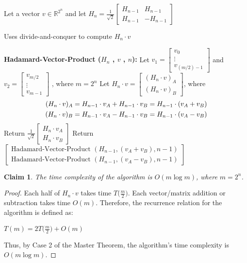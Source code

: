 \documentclass[11pt]{article}
\theoremstyle{definition}
\theoremstyle{plain}
\newtheorem{claim}{Claim}
\theoremstyle{indented-remark}
\theoremstyle{indented-proof}
\begin{document}
\noindent Let a vector $v \in \mathbb{R}^{2^{n}}$ and let 
$H_{n} = \frac{1}{\sqrt{2}}
\begin{bmatrix} 
H_{n-1} & H_{n-1} \\
H_{n-1} & -H_{n-1} 
\end{bmatrix}$
\begin{algorithm}
\caption{Uses divide-and-conquer to compute $H_{n} \cdot v$}
\begin{algorithmic}
\STATE \textbf{Hadamard-Vector-Product ($H_{n}$ , $v$ , $n$):}
\STATE Let $v_{1} = 
\begin{bmatrix} 
v_{0} \\
\vdots \\
v_{(m/2) -1} 
\end{bmatrix}$ and
$v_{2} = 
\begin{bmatrix} 
v_{m/2} \\
\vdots \\
v_{m-1} 
\end{bmatrix}$ ,
where $m = 2^{n}$
\STATE Let $H_{n} \cdot v =  
\begin{bmatrix} 
(H_{n} \cdot v)_{A} \\
(H_{n} \cdot v)_{B} 
\end{bmatrix}$, where
\begin{align}
(H_{n} \cdot v)_{A} &= H_{n-1} \cdot v_{A} + H_{n-1} \cdot v_{B} = H_{n-1} \cdot (v_{A}+v_{B}) \notag \\
(H_{n} \cdot v)_{B} &= H_{n-1} \cdot v_{A} - H_{n-1} \cdot v_{B} = H_{n-1} \cdot (v_{A}-v_{B}) \notag
\end{align}
\STATE Return $\frac{1}{\sqrt{2}}
\begin{bmatrix} 
H_{n} \cdot v_{A} \\
H_{n} \cdot v_{B} 
\end{bmatrix}$
\ELSE [$n > 1$]
\STATE Return $
\begin{bmatrix}
\text{Hadamard-Vector-Product } (H_{n-1} , (v_{A}+v_{B}) , n-1) \\
\text{Hadamard-Vector-Product } (H_{n-1} , (v_{A}-v_{B}) , n-1)
\end{bmatrix}$
\ENDIF
\end{algorithmic}
\end{algorithm}

\begin{claim}
The time complexity of the algorithm is $O(m \log m)$, where $m = 2^{n}$.
\end{claim}

\begin{proof}
Each half of $H_{n} \cdot v$ takes time $T\big( \frac{m}{2} \big)$. Each vector/matrix addition or subtraction takes time $O(m)$.
Therefore, the recurrence relation for the algorithm is defined as:
\begin{center}
$T(m) = 2T\big( \frac{m}{2} \big) + O(m)$
\end{center}
Thus, by Case 2 of the Master Theorem, the algorithm's time complexity is $O(m \log m)$.
\end{proof}
\end{document}
